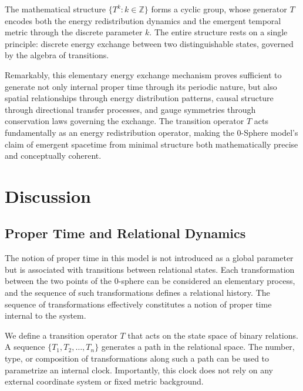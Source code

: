 \documentclass[%
 reprint,
 amsmath,amssymb,
 aps,
]{revtex4-1}
\numberwithin{equation}{section}%
\begin{document}
The mathematical structure $\{T^k : k \in \mathbb{Z}\}$ forms a cyclic group, whose generator $T$ encodes both the energy redistribution dynamics and the emergent temporal metric through the discrete parameter $k$. The entire structure rests on a single principle: discrete energy exchange between two distinguishable states, governed by the algebra of transitions.

Remarkably, this elementary energy exchange mechanism proves sufficient to generate not only internal proper time through its periodic nature, but also spatial relationships through energy distribution patterns, causal structure through directional transfer processes, and gauge symmetries through conservation laws governing the exchange. The transition operator $T$ acts fundamentally as an energy redistribution operator, making the 0-Sphere model's claim of emergent spacetime from minimal structure both mathematically precise and conceptually coherent.


\section{Discussion}
\label{sec:discussion}

\subsection{Proper Time and Relational Dynamics}
\label{subsec:proper_time}

The notion of proper time in this model is not introduced as a global parameter but is associated with transitions between relational states. Each transformation between the two points of the 0-sphere can be considered an elementary process, and the sequence of such transformations defines a relational history. The sequence of transformations effectively constitutes a notion of proper time internal to the system.

We define a transition operator $T$ that acts on the state space of binary relations. A sequence $\{T_1, T_2, \ldots, T_n\}$ generates a path in the relational space. The number, type, or composition of transformations along such a path can be used to parametrize an internal clock. Importantly, this clock does not rely on any external coordinate system or fixed metric background.
\end{document}
